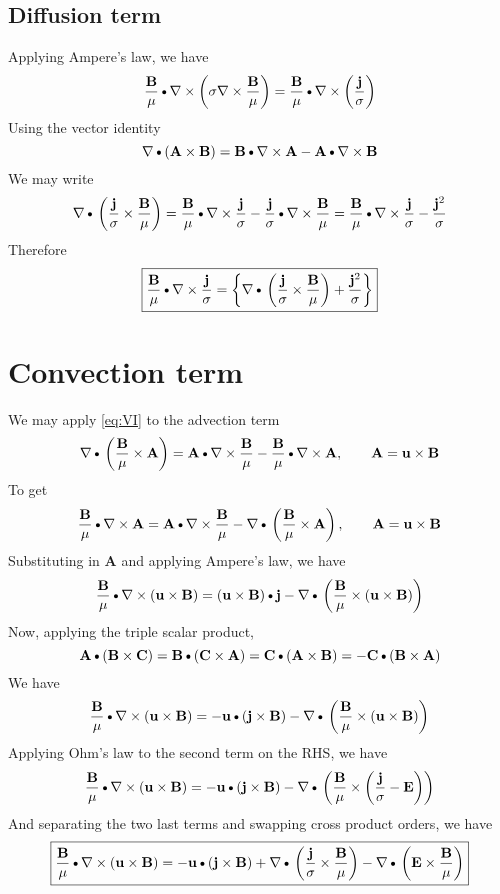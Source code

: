 \documentclass[11pt]{article}
\newcommand{\A}{\mathbf{A}}
\newcommand{\B}{\mathbf{B}}
\newcommand{\C}{\mathbf{C}}
\newcommand{\BM}{\frac{\mathbf{B}}{\mu}}
\newcommand{\J}{\mathbf{j}}
\newcommand{\E}{\mathbf{E}}
\newcommand{\JS}{\frac{\mathbf{j}}{\sigma}}
\newcommand{\JSS}{\frac{\mathbf{j}^2}{\sigma}}
\newcommand{\U}{\mathbf{u}}
\newcommand{\SI}{\sigma}
\newcommand{\DOT}{\text{\textbullet}}
\begin{document}
\subsection{Diffusion term}
Applying Ampere's law, we have
\begin{equation}
	\BM \DOT \nabla \times \left( \SI \nabla \times \BM \right) = \BM \DOT \nabla \times \left( \JS \right)
\end{equation}
Using the vector identity
\begin{equation} \label{eq:VI}
	\nabla \DOT (\A \times \B) = \B \DOT \nabla \times \A - \A \DOT \nabla \times \B
\end{equation}
We may write
\begin{equation}
	\nabla \DOT \left(\JS \times \BM \right) = 
	\BM \DOT \nabla \times \JS - \JS \DOT \nabla \times \BM = 
	\BM \DOT \nabla \times \JS - \JSS
\end{equation}
Therefore
\begin{equation}
	\boxed{
	\BM \DOT \nabla \times \JS = 
	\left\{ \nabla \DOT \left(\JS \times \BM \right) + \JSS \right\}
	}
\end{equation}
\section{Convection term}
We may apply \ref{eq:VI} to the advection term
\begin{equation}
	\nabla \DOT \left(\BM \times \A \right) = \A \DOT \nabla \times \BM - \BM \DOT \nabla \times \A, \qquad \A = \U \times \B
\end{equation}
To get
\begin{equation}
	\BM \DOT \nabla \times \A = \A \DOT \nabla \times \BM - \nabla \DOT \left(\BM \times \A \right), \qquad \A = \U \times \B
\end{equation}
Substituting in $\A$ and applying Ampere's law, we have
\begin{equation}
	\BM \DOT \nabla \times (\U \times \B) = (\U \times \B) \DOT \J - \nabla \DOT \left(\BM \times (\U \times \B) \right)
\end{equation}
Now, applying the triple scalar product,
\begin{equation}
	\A \DOT (\B \times \C) = \B \DOT (\C \times \A) = \C \DOT (\A \times \B) = - \C \DOT (\B \times \A)
\end{equation}
We have
\begin{equation}
	\BM \DOT \nabla \times (\U \times \B) = -\U \DOT (\J \times \B) - \nabla \DOT \left(\BM \times (\U \times \B) \right)
\end{equation}
Applying Ohm's law to the second term on the RHS, we have
\begin{equation}
	\BM \DOT \nabla \times (\U \times \B) = -
	\U \DOT (\J \times \B) - 
	\nabla \DOT \left(\BM \times \left(\JS - \E \right) \right)
\end{equation}
And separating the two last terms and swapping cross product orders, we have
\begin{equation}
	\boxed{
	\BM \DOT \nabla \times (\U \times \B) = -
	\U \DOT (\J \times \B) + 
	\nabla \DOT \left(\JS \times \BM \right) -
	\nabla \DOT \left(\E \times \BM \right)
	}
\end{equation}
\end{document}
